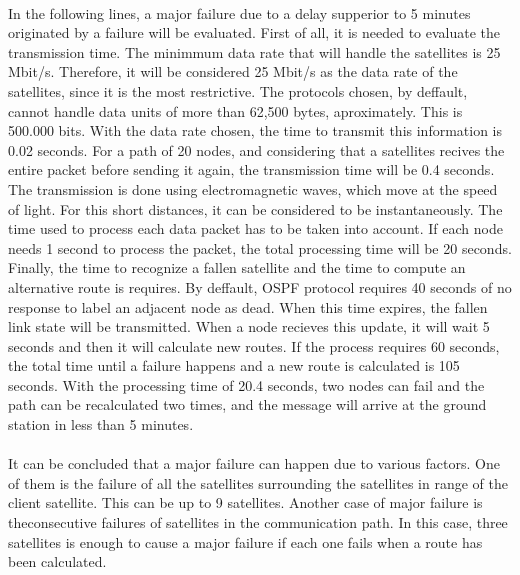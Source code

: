 \documentclass[12pt,a4paper]{report}
\begin{document}
\paragraph{}In the following lines, a major failure due to a delay supperior to 5 minutes originated by a failure will be evaluated. First of all, it is needed to evaluate the transmission time. The minimmum data rate that will handle the satellites is 25 Mbit/s. Therefore, it will be considered 25 Mbit/s as the data rate of the satellites, since it is the most restrictive. The protocols chosen, by deffault, cannot handle data units of more than 62,500 bytes, aproximately. This is 500.000 bits. With the data rate chosen, the time to transmit this information is 0.02 seconds. For a path of 20 nodes, and considering that a satellites recives the entire packet before sending it again, the transmission time will be 0.4 seconds. The transmission is done using electromagnetic waves, which move at the speed of light. For this short distances, it can be considered to be instantaneously. The time used to process each data packet has to be taken into account. If each node needs 1 second to process the packet, the total processing time will be 20 seconds. Finally, the time to recognize a fallen satellite and the time to compute an alternative route is requires. By deffault, OSPF protocol requires 40 seconds of no response to label an adjacent node as dead. When this time expires, the fallen link state will be transmitted. When a node recieves this update, it will wait 5 seconds and then it will calculate new routes. If the process requires 60 seconds, the total time until a failure happens and a new route is calculated is 105 seconds. With the processing time of 20.4 seconds, two nodes can fail and the path can be recalculated two times, and the message will arrive at the ground station in less than 5 minutes.

\paragraph{}It can be concluded that a major failure can happen due to various factors. One of them is the failure of all the satellites surrounding the satellites in range of the client satellite. This can be up to 9 satellites. Another case of major failure is theconsecutive failures of satellites in the communication path. In this case, three satellites is enough to cause a major failure if each one fails when a route has been calculated.
\end{document}
